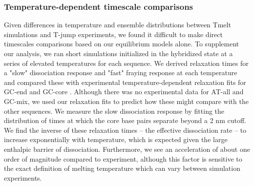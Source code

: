 \documentclass[journal=jpcbfk,manuscript=article]{achemso}
\begin{document}
\subsubsection{\label{sec:Results}Temperature-dependent timescale comparisons}

Given differences in temperature and ensemble distributions between Tmelt simulations and T-jump experiments, we found it difficult to make direct timescales comparisons based on our equilibrium models alone. To supplement our analysis, we ran short simulations initialized in the hybridized state at a series of elevated temperatures for each sequence. We derived relaxation times for a "slow" dissociation response and "fast" fraying response at each temperature and compared these with experimental temperature-dependent relaxation fits for GC-end and GC-core \citep{Sanstead2018DirectDehybridization}. Although there was no experimental data for AT-all and GC-mix, we used our relaxation fits to predict how these might compare with the other sequences. We measure the slow dissociation response by fitting the distribution of times at which the core base pairs separate beyond a 2 nm cutoff. We find the inverse of these relaxation times -- the effective dissociation rate -- to increase exponentially with temperature, which is expected given the large enthalpic barrier of dissociation. Furthermore, we see an acceleration of about one order of magnitude compared to experiment, although this factor is sensitive to the exact definition of melting temperature which can vary between simulation experiments. 
\end{document}
